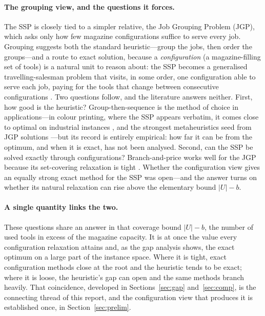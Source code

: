 \documentclass[11pt,a4paper]{article}
\theoremstyle{plain}
\theoremstyle{definition}
\theoremstyle{remark}
\newcommand{\U}{U}
\begin{document}
\paragraph{The grouping view, and the questions it forces.}
The SSP is closely tied to a simpler relative, the Job Grouping Problem (JGP), which
asks only how few magazine configurations suffice to serve every job. Grouping
suggests both the standard heuristic---group the jobs, then order the groups---and a
route to exact solution, because a \emph{configuration} (a magazine-filling set of
tools) is a natural unit to reason about: the SSP becomes a generalised
travelling-salesman problem that visits, in some order, one configuration able to
serve each job, paying for the tools that change between consecutive configurations
\citep{Colares2026Exact}. Two questions follow, and the literature answers neither.
First, how good is the heuristic? Group-then-sequence is the method of choice in
applications---in colour printing, where the SSP appears verbatim, it comes close to
optimal on industrial instances \citep{Burger2015}, and the strongest metaheuristics
seed from JGP solutions \citep{Mecler2021}---but its record is entirely empirical:
how far it can be from the optimum, and when it is exact, has not been analysed.
Second, can the SSP be solved exactly through configurations?
Branch-and-price works well for the JGP because its set-covering relaxation is
tight \citep{Otiai2026}. Whether the configuration view gives an equally strong
exact method for the SSP was open---and the answer turns on whether its natural
relaxation can rise above the elementary bound $\lvert\U\rvert-b$.

\paragraph{A single quantity links the two.}
These questions share an answer in that coverage bound $\lvert\U\rvert-b$, the number
of used tools in excess of the magazine capacity. It is at once the value every
configuration relaxation attains and, as the gap analysis shows, the exact optimum on
a large part of the instance space. Where it is tight, exact configuration methods
close at the root and the heuristic tends to be exact; where it is loose, the
heuristic's gap can open and the same methods branch heavily. That coincidence,
developed in Sections~\ref{sec:gap} and~\ref{sec:comp}, is the connecting thread of
this report, and the configuration view that produces it is established once, in
Section~\ref{sec:prelim}.
\end{document}
